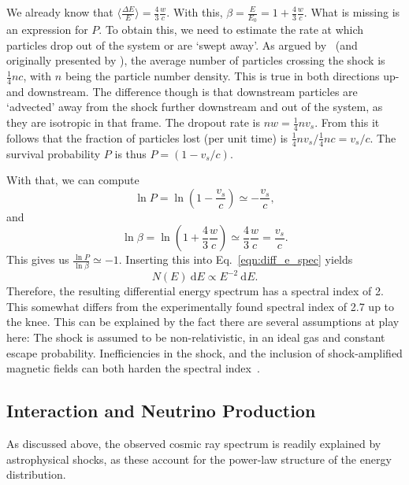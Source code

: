 We already know that $\big\langle\frac{\Delta E}{E}\big\rangle = \frac{4}{3}\frac{w}{c}$. With this, $\beta = \frac{E}{E_0} = 1 + \frac{4}{3}\frac{w}{c}$. What is missing is an expression for $P$. To obtain this, we need to estimate the rate at which particles drop out of the system or are `swept away'. As argued by~\cite{Longair2011} (and originally presented by ), the average number of particles crossing the shock is $\frac{1}{4} n c$, with $n$ being the particle number density. This is true in both directions up- and downstream. The difference though is that downstream particles are `advected' away from the shock further downstream and out of the system, as they are isotropic in that frame. The dropout rate is $n w=\frac{1}{4}nv_s$. From this it follows that the fraction of particles lost (per unit time) is $\frac{1}{4} n v_s/\frac{1}{4}nc = v_s/c$. The survival probability $P$ is thus $P=(1-v_s/c)$.

With that, we can compute
\begin{equation}
    \ln P = \ln ( 1-\frac{v_s}{c}) \simeq -\frac{v_s}{c},
\end{equation}
and
\begin{equation}
    \ln \beta = \ln(1+\frac{4}{3}\frac{w}{c}) \simeq \frac{4}{3}\frac{w}{c} = \frac{v_s}{c}.
\end{equation}
This gives us $\frac{\ln P}{\ln \beta} \simeq -1$. Inserting this into Eq.~\ref{eqn:diff_e_spec} yields
\begin{equation}
    N(E)~\text{d} E \propto E^{-2}~\text{d} E.
\end{equation}
Therefore, the resulting differential energy spectrum has a spectral index of 2. This somewhat differs from the experimentally found spectral index of 2.7 up to the knee. This can be explained by the fact there are several assumptions at play here: The shock is assumed to be non-relativistic, in an ideal gas and constant escape probability. Inefficiencies in the shock, and the inclusion of shock-amplified magnetic fields can both harden the spectral index~\cite{Spurio2018}.

\subsection{Interaction and Neutrino Production}\label{cr_interactions}
As discussed above, the observed cosmic ray spectrum is readily explained by astrophysical shocks, as these account for the power-law structure of the energy distribution.

